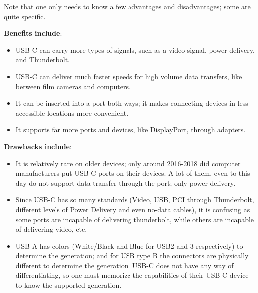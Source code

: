 \documentclass[../main.tex]{subfiles}
\begin{document}
Note that one only needs to know a few advantages and disadvantages; some are quite specific.

\textbf{Benefits include}:
\begin{itemize}
    \item USB-C can carry more types of signals, such as a video signal, power delivery, and Thunderbolt.
    \item USB-C can deliver much faster speeds for high volume data transfers, like between film cameras and computers.
    \item It can be inserted into a port both ways; it makes connecting devices in less accessible locations more convenient.
    \item It supports far more ports and devices, like DisplayPort, through adapters.
\end{itemize}

\textbf{Drawbacks include}:
\begin{itemize}
    \item It is relatively rare on older devices; only around 2016-2018 did computer manufacturers put USB-C ports on their devices. A lot of them, even to this day do not support data transfer through the port; only power delivery.
    \item Since USB-C has so many standards (Video, USB, PCI through Thunderbolt, different levels of Power Delivery and even no-data cables), it is confusing as some ports are incapable of delivering thunderbolt, while others are incapable of delivering video, etc.
    \item USB-A has colors (White/Black and Blue for USB2 and 3 respectively) to determine the generation; and for USB type B the connectors are physically different to determine the generation. USB-C does not have any way of differentiating, so one must memorize the capabilities of their USB-C device to know the supported generation.
\end{itemize}
\end{document}

